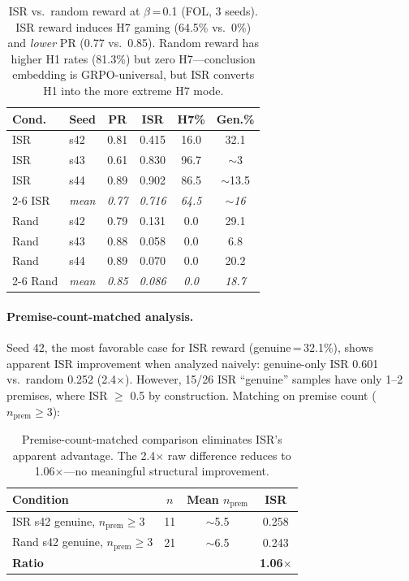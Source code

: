 \documentclass[11pt,a4paper]{article}
\begin{document}
\begin{table}[t]
\centering
\small
\setlength{\tabcolsep}{3pt}
\begin{tabular}{llcccc}
\toprule
\textbf{Cond.} & \textbf{Seed} & \textbf{PR} & \textbf{ISR} & \textbf{H7\%} & \textbf{Gen.\%} \\
\midrule
ISR & s42 & 0.81 & 0.415 & 16.0 & 32.1 \\
ISR & s43 & 0.61 & 0.830 & 96.7 & $\sim$3 \\
ISR & s44 & 0.89 & 0.902 & 86.5 & $\sim$13.5 \\
\cmidrule{2-6}
ISR & \textit{mean} & \textit{0.77} & \textit{0.716} & \textit{64.5} & \textit{$\sim$16} \\
\midrule
Rand & s42 & 0.79 & 0.131 & 0.0 & 29.1 \\
Rand & s43 & 0.88 & 0.058 & 0.0 & 6.8 \\
Rand & s44 & 0.89 & 0.070 & 0.0 & 20.2 \\
\cmidrule{2-6}
Rand & \textit{mean} & \textit{0.85} & \textit{0.086} & \textit{0.0} & \textit{18.7} \\
\bottomrule
\end{tabular}
\caption{ISR vs.\ random reward at $\beta$\,=\,0.1 (FOL, 3 seeds). ISR reward induces H7 gaming (64.5\% vs.\ 0\%) and \emph{lower} PR (0.77 vs.\ 0.85). Random reward has higher H1 rates (81.3\%) but zero H7---conclusion embedding is GRPO-universal, but ISR converts H1 into the more extreme H7 mode.}
\label{tab:goodhart_3seed}
\end{table}

\paragraph{Premise-count-matched analysis.}
Seed 42, the most favorable case for ISR reward (genuine\,=\,32.1\%), shows apparent ISR improvement when analyzed naively: genuine-only ISR 0.601 vs.\ random 0.252 (2.4$\times$).
However, 15/26 ISR ``genuine'' samples have only 1--2 premises, where ISR $\geq$ 0.5 by construction.
Matching on premise count ($n_{\text{prem}} \geq 3$):

\begin{table}[h]
\centering
\small
\begin{tabular}{lccc}
\toprule
\textbf{Condition} & $n$ & \textbf{Mean $n_{\text{prem}}$} & \textbf{ISR} \\
\midrule
ISR s42 genuine, $n_{\text{prem}} \geq 3$ & 11 & $\sim$5.5 & 0.258 \\
Rand s42 genuine, $n_{\text{prem}} \geq 3$ & 21 & $\sim$6.5 & 0.243 \\
\midrule
\multicolumn{3}{l}{\textbf{Ratio}} & \textbf{1.06$\times$} \\
\bottomrule
\end{tabular}
\caption{Premise-count-matched comparison eliminates ISR's apparent advantage. The 2.4$\times$ raw difference reduces to 1.06$\times$---no meaningful structural improvement.}
\label{tab:premise_matched}
\end{table}
\end{document}
